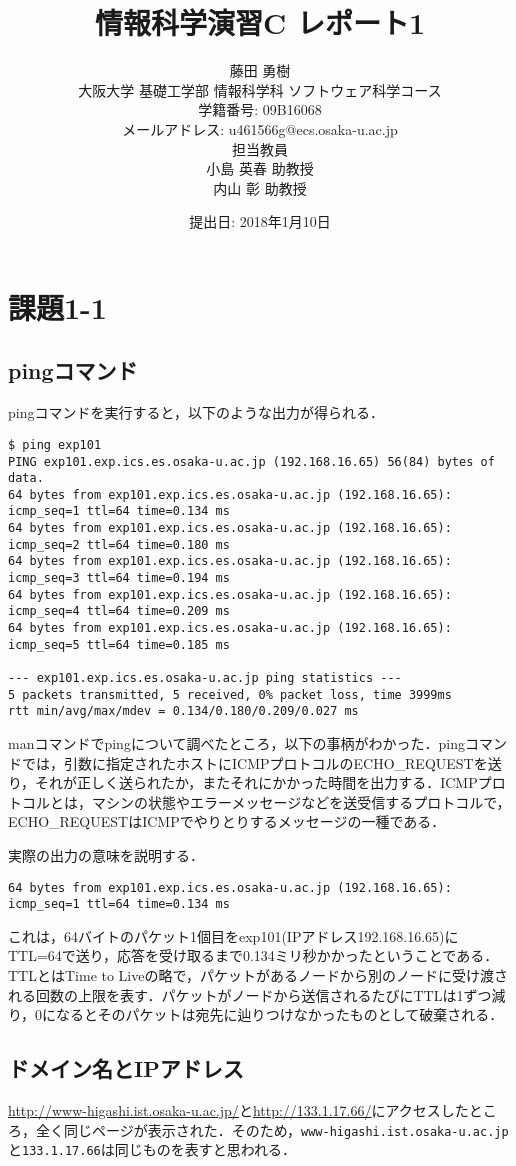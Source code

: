 \documentclass[a4j,10pt,titlepage]{jsarticle}
\title{情報科学演習C レポート1}
\author{藤田 勇樹 \\
大阪大学 基礎工学部 情報科学科 ソフトウェア科学コース\\
学籍番号: 09B16068 \\
メールアドレス: u461566g@ecs.osaka-u.ac.jp \\
担当教員\\
小島 英春 助教授 \\
内山 彰 助教授}
\date{提出日: 2018年1月10日}
\begin{document}
\maketitle
\section{課題1-1}
\subsection{pingコマンド}\label{sec:ping}
pingコマンドを実行すると，以下のような出力が得られる．
\begin{verbatim}
$ ping exp101 
PING exp101.exp.ics.es.osaka-u.ac.jp (192.168.16.65) 56(84) bytes of data.
64 bytes from exp101.exp.ics.es.osaka-u.ac.jp (192.168.16.65): icmp_seq=1 ttl=64 time=0.134 ms
64 bytes from exp101.exp.ics.es.osaka-u.ac.jp (192.168.16.65): icmp_seq=2 ttl=64 time=0.180 ms
64 bytes from exp101.exp.ics.es.osaka-u.ac.jp (192.168.16.65): icmp_seq=3 ttl=64 time=0.194 ms
64 bytes from exp101.exp.ics.es.osaka-u.ac.jp (192.168.16.65): icmp_seq=4 ttl=64 time=0.209 ms
64 bytes from exp101.exp.ics.es.osaka-u.ac.jp (192.168.16.65): icmp_seq=5 ttl=64 time=0.185 ms

--- exp101.exp.ics.es.osaka-u.ac.jp ping statistics ---
5 packets transmitted, 5 received, 0% packet loss, time 3999ms
rtt min/avg/max/mdev = 0.134/0.180/0.209/0.027 ms
\end{verbatim}

manコマンドでpingについて調べたところ，以下の事柄がわかった．pingコマンドでは，引数に指定されたホストにICMPプロトコルのECHO\_REQUESTを送り，それが正しく送られたか，またそれにかかった時間を出力する．ICMPプロトコルとは，マシンの状態やエラーメッセージなどを送受信するプロトコルで，ECHO\_REQUESTはICMPでやりとりするメッセージの一種である．

実際の出力の意味を説明する．
\begin{verbatim}
64 bytes from exp101.exp.ics.es.osaka-u.ac.jp (192.168.16.65): icmp_seq=1 ttl=64 time=0.134 ms
\end{verbatim}
これは，64バイトのパケット1個目をexp101(IPアドレス192.168.16.65)にTTL=64で送り，応答を受け取るまで0.134ミリ秒かかったということである．TTLとはTime to Liveの略で，パケットがあるノードから別のノードに受け渡される回数の上限を表す．パケットがノードから送信されるたびにTTLは1ずつ減り，0になるとそのパケットは宛先に辿りつけなかったものとして破棄される．

\subsection{ドメイン名とIPアドレス}\label{sec:domainip}
\url{http://www-higashi.ist.osaka-u.ac.jp/}と\url{http://133.1.17.66/}にアクセスしたところ，全く同じページが表示された．そのため，\verb|www-higashi.ist.osaka-u.ac.jp|と\verb|133.1.17.66|は同じものを表すと思われる．
\end{document}
